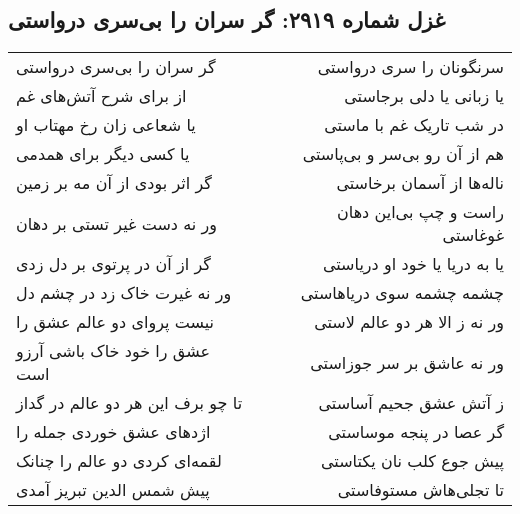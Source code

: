 \begin{center}
\section*{غزل شماره ۲۹۱۹: گر سران را بی‌سری درواستی}
\label{sec:2919}
\begin{longtable}{l p{0.5cm} r}
گر سران را بی‌سری درواستی
&&
سرنگونان را سری درواستی
\\
از برای شرح آتش‌های غم
&&
یا زبانی یا دلی برجاستی
\\
یا شعاعی زان رخ مهتاب او
&&
در شب تاریک غم با ماستی
\\
یا کسی دیگر برای همدمی
&&
هم از آن رو بی‌سر و بی‌پاستی
\\
گر اثر بودی از آن مه بر زمین
&&
ناله‌ها از آسمان برخاستی
\\
ور نه دست غیر تستی بر دهان
&&
راست و چپ بی‌این دهان غوغاستی
\\
گر از آن در پرتوی بر دل زدی
&&
یا به دریا یا خود او دریاستی
\\
ور نه غیرت خاک زد در چشم دل
&&
چشمه چشمه سوی دریاهاستی
\\
نیست پروای دو عالم عشق را
&&
ور نه ز الا هر دو عالم لاستی
\\
عشق را خود خاک باشی آرزو است
&&
ور نه عاشق بر سر جوزاستی
\\
تا چو برف این هر دو عالم در گداز
&&
ز آتش عشق جحیم آساستی
\\
اژدهای عشق خوردی جمله را
&&
گر عصا در پنجه موساستی
\\
لقمه‌ای کردی دو عالم را چنانک
&&
پیش جوع کلب نان یکتاستی
\\
پیش شمس الدین تبریز آمدی
&&
تا تجلی‌هاش مستوفاستی
\\
\end{longtable}
\end{center}
